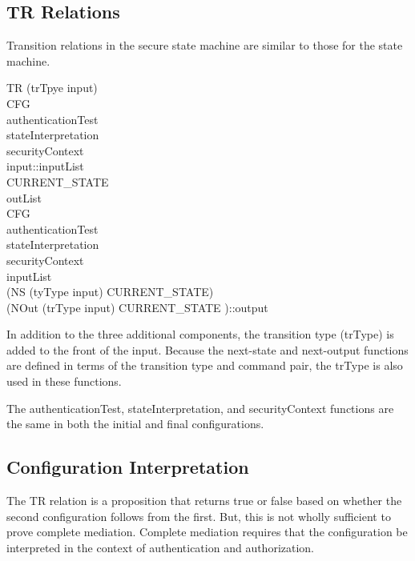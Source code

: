 \documentclass[../../main/main.tex]{subfiles}
\begin{document}
\subsection{TR Relations}
Transition relations in the secure state machine are similar to those for the state machine.  

TR (trTpye input)\\
CFG \\
\hspace{1cm}authenticationTest\\
\hspace{1cm}stateInterpretation\\
\hspace{1cm}securityContext\\
\hspace{1cm}input::inputList\\
\hspace{1cm}CURRENT_STATE\\
\hspace{1cm}outList\\
CFG\\
\hspace{1cm}authenticationTest\\
\hspace{1cm}stateInterpretation\\
\hspace{1cm}securityContext\\
\hspace{1cm}inputList\\
\hspace{1cm}(NS (tyType input) CURRENT_STATE)\\
\hspace{1cm}(NOut (trType input) CURRENT_STATE )::output

In addition to the three additional components, the transition type (trType) is added to the front of the input.  Because the next-state and next-output functions are defined in terms of the transition type and command pair, the trType is also used in these functions.   

The authenticationTest, stateInterpretation, and securityContext functions are the same in both the initial and final configurations.

\subsection{Configuration Interpretation}
The TR relation is a proposition that returns true or false based on whether the second configuration follows from the first.  But, this is not wholly sufficient to prove complete mediation.  Complete mediation requires that the configuration be interpreted in the context of authentication and authorization.
\end{document}
